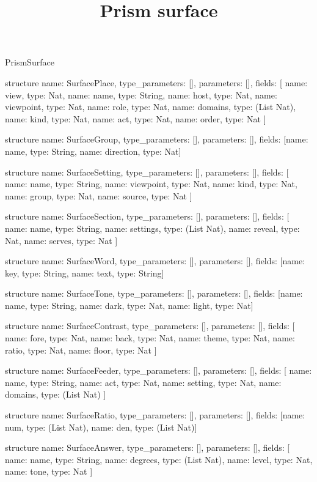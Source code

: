 \begin{lexlean}{PrismSurface}
\title{Prism surface}
\begin{semanticmodule}
structure{
  name: SurfacePlace,
  type_parameters: [],
  parameters: [],
  fields: [
    {name: view, type: Nat},
    {name: name, type: String},
    {name: host, type: Nat},
    {name: viewpoint, type: Nat},
    {name: role, type: Nat},
    {name: domains, type: (List Nat)},
    {name: kind, type: Nat},
    {name: act, type: Nat},
    {name: order, type: Nat}
  ]
}

structure{
  name: SurfaceGroup,
  type_parameters: [],
  parameters: [],
  fields: [{name: name, type: String}, {name: direction, type: Nat}]
}

structure{
  name: SurfaceSetting,
  type_parameters: [],
  parameters: [],
  fields: [
    {name: name, type: String},
    {name: viewpoint, type: Nat},
    {name: kind, type: Nat},
    {name: group, type: Nat},
    {name: source, type: Nat}
  ]
}

structure{
  name: SurfaceSection,
  type_parameters: [],
  parameters: [],
  fields: [
    {name: name, type: String},
    {name: settings, type: (List Nat)},
    {name: reveal, type: Nat},
    {name: serves, type: Nat}
  ]
}

structure{
  name: SurfaceWord,
  type_parameters: [],
  parameters: [],
  fields: [{name: key, type: String}, {name: text, type: String}]
}

structure{
  name: SurfaceTone,
  type_parameters: [],
  parameters: [],
  fields: [{name: name, type: String}, {name: dark, type: Nat}, {name: light, type: Nat}]
}

structure{
  name: SurfaceContrast,
  type_parameters: [],
  parameters: [],
  fields: [
    {name: fore, type: Nat},
    {name: back, type: Nat},
    {name: theme, type: Nat},
    {name: ratio, type: Nat},
    {name: floor, type: Nat}
  ]
}

structure{
  name: SurfaceFeeder,
  type_parameters: [],
  parameters: [],
  fields: [
    {name: name, type: String},
    {name: act, type: Nat},
    {name: setting, type: Nat},
    {name: domains, type: (List Nat)}
  ]
}

structure{
  name: SurfaceRatio,
  type_parameters: [],
  parameters: [],
  fields: [{name: num, type: (List Nat)}, {name: den, type: (List Nat)}]
}

structure{
  name: SurfaceAnswer,
  type_parameters: [],
  parameters: [],
  fields: [
    {name: name, type: String},
    {name: degrees, type: (List Nat)},
    {name: level, type: Nat},
    {name: tone, type: Nat}
  ]
}


\end{semanticmodule}
\end{lexlean}
